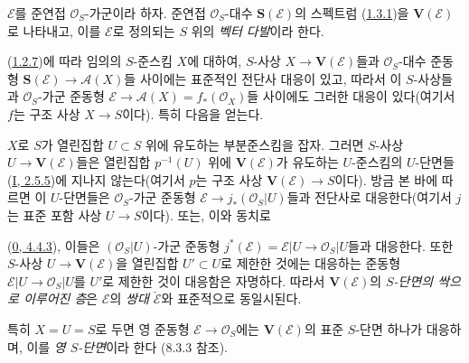 \begin{definition}[1.7.8]
\label{II.1.7.8-ko}
$\mathcal{E}$를 준연접 $\mathcal{O}_S$-가군이라 하자. 준연접
$\mathcal{O}_S$-대수 $\mathbf{S}(\mathcal{E})$의 스펙트럼
(\hyperref[II.1.3.1-ko]{1.3.1})을 $\mathbf{V}(\mathcal{E})$로 나타내고,
이를 $\mathcal{E}$로 정의되는 $S$ 위의 \emph{벡터 다발}이라 한다.
\end{definition}

(\hyperref[II.1.2.7-ko]{1.2.7})에 따라 임의의 $S$-준스킴 $X$에 대하여,
$S$-사상 $X\to\mathbf{V}(\mathcal{E})$들과 $\mathcal{O}_S$-대수 준동형
$\mathbf{S}(\mathcal{E})\to\mathcal{A}(X)$들 사이에는 표준적인 전단사
대응이 있고, 따라서 이 $S$-사상들과 $\mathcal{O}_S$-가군 준동형
$\mathcal{E}\to\mathcal{A}(X)=f_*(\mathcal{O}_X)$들 사이에도 그러한
대응이 있다(여기서 $f$는 구조 사상 $X\to S$이다). 특히 다음을 얻는다.

\begin{env}[1.7.9]
\label{II.1.7.9-ko}
$X$로 $S$가 열린집합 $U\subset S$ 위에 유도하는 부분준스킴을 잡자.
그러면 $S$-사상 $U\to\mathbf{V}(\mathcal{E})$들은 열린집합
$p^{-1}(U)$ 위에 $\mathbf{V}(\mathcal{E})$가 유도하는 $U$-준스킴의
$U$-단면들(\hyperref[I.2.5.5-ko]{I, 2.5.5})에 지나지 않는다(여기서
$p$는 구조 사상 $\mathbf{V}(\mathcal{E})\to S$이다). 방금 본 바에
따르면 이 $U$-단면들은 $\mathcal{O}_S$-가군 준동형
$\mathcal{E}\to j_*(\mathcal{O}_S|U)$들과 전단사로 대응한다(여기서
$j$는 표준 포함 사상 $U\to S$이다). 또는, 이와 동치로

(\hyperref[0.4.4.3-ko]{0, 4.4.3}), 이들은 $(\mathcal{O}_S|U)$-가군
준동형
$j^*(\mathcal{E})=\mathcal{E}|U\to\mathcal{O}_S|U$들과 대응한다. 또한
$S$-사상 $U\to\mathbf{V}(\mathcal{E})$을 열린집합 $U'\subset U$로
제한한 것에는 대응하는 준동형
$\mathcal{E}|U\to\mathcal{O}_S|U$를 $U'$로 제한한 것이 대응함은
자명하다. 따라서 $\mathbf{V}(\mathcal{E})$의 \emph{$S$-단면의 싹으로
이루어진 층}은 $\mathcal{E}$의 \emph{쌍대 $\check{\mathcal{E}}$}와
표준적으로 동일시된다.

특히 $X=U=S$로 두면 영 준동형
$\mathcal{E}\to\mathcal{O}_S$에는 $\mathbf{V}(\mathcal{E})$의 표준
$S$-단면 하나가 대응하며, 이를 \emph{영 $S$-단면}이라 한다
(8.3.3 참조).
\end{env}


